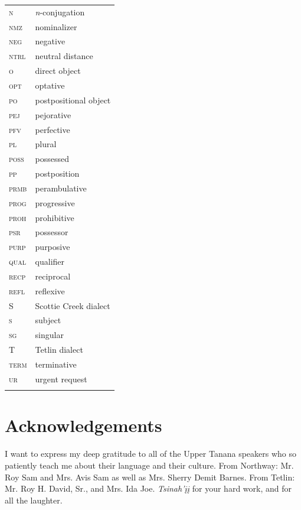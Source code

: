 \documentclass[output=paper,colorlinks,citecolor=brown]{langscibook}
\begin{document}
\begin{tabularx}{.5\textwidth}{@{}lQ@{}}
\textsc{n} & \textit{n}-conjugation \\
\textsc{nmz} & nominalizer \\
\textsc{neg} & negative \\
\textsc{ntrl} & neutral distance \\
\textsc{o} & direct object \\
\textsc{opt} & optative \\
\textsc{po} & postpositional object \\
\textsc{pej} & pejorative \\
\textsc{pfv} & perfective \\
\textsc{pl} & plural \\
\textsc{poss} & possessed \\
\textsc{pp} & postposition \\
\textsc{prmb} & perambulative \\
\textsc{prog} & progressive \\
\textsc{proh} & prohibitive \\
\textsc{psr} & possessor \\
\textsc{purp} & purposive \\
\textsc{qual} & qualifier \\
\textsc{recp} & reciprocal \\
\textsc{refl} & reflexive \\
S & Scottie Creek dialect \\
\textsc{s} & subject \\
\textsc{sg} & singular \\
T & Tetlin dialect \\
\textsc{term} & terminative \\
\textsc{ur} & urgent request \\\\
\end{tabularx}


\section*{Acknowledgements}

I want to express my deep gratitude to all of the Upper Tanana speakers who so patiently teach me about their language and their culture. From Northway: Mr. Roy Sam and Mrs. Avis Sam as well as Mrs. Sherry Demit Barnes. From Tetlin: Mr. Roy H. David, Sr., and Mrs. Ida Joe. \textit{Tsinah'įį} for your hard work, and for all the laughter. 
\end{document}
